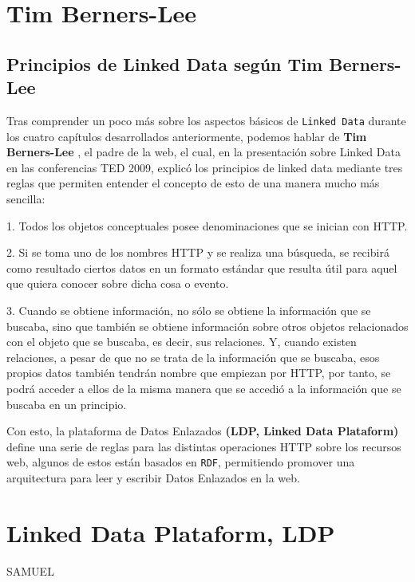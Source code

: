 \documentclass[11pt]{report}
\begin{document}
\chapter{Tim Berners-Lee}

\section{Principios de Linked Data según Tim Berners-Lee}

Tras comprender un poco más sobre los aspectos básicos de \texttt{Linked Data} durante los cuatro capítulos desarrollados anteriormente, podemos hablar de \textbf{Tim Berners-Lee } \cite{11}, el padre de la web,  el cual, en la presentación sobre Linked Data en las conferencias TED 2009, explicó los principios de linked data mediante tres reglas que permiten entender el concepto de esto de una manera mucho más sencilla:

1. Todos los objetos conceptuales posee denominaciones que se inician con HTTP.

2. Si se toma uno de los nombres HTTP y se realiza una búsqueda, se recibirá como resultado ciertos datos en un formato estándar que resulta útil para aquel que quiera conocer sobre dicha cosa o evento.

3. Cuando se obtiene información, no sólo se obtiene la información que se buscaba, sino que también se obtiene información sobre otros objetos relacionados con el objeto que se buscaba, es decir, sus relaciones. Y, cuando existen relaciones, a pesar de que no se trata de la información que se buscaba, esos propios datos también tendrán nombre que empiezan por HTTP, por tanto, se podrá acceder a ellos de la misma manera que se accedió a la información que se buscaba en un principio.

Con esto, la plataforma de Datos Enlazados \textbf{(LDP, Linked Data Plataform)} define una serie de reglas para las distintas operaciones HTTP sobre los recursos web, algunos de estos están basados en \texttt{RDF}, permitiendo promover una arquitectura para leer y escribir Datos Enlazados en la web.

\chapter{Linked Data Plataform, LDP}
SAMUEL
\end{document}
